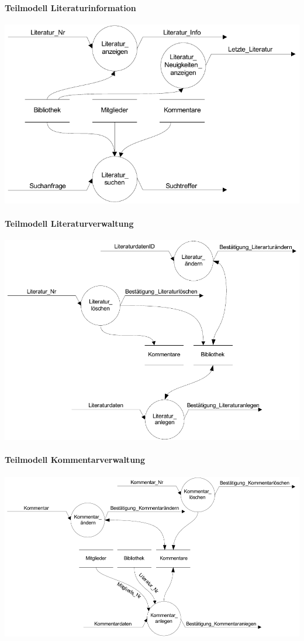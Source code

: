 \paragraph{Teilmodell Literaturinformation}
\includegraphics[scale=1.0]{teilmodell_literaturinformation}

\paragraph{Teilmodell Literaturverwaltung}
\includegraphics[scale=0.93]{teilmodell_bibliotheksverwaltung}

\paragraph{Teilmodell Kommentarverwaltung}
\includegraphics[scale=0.88]{teilmodell_kommentarverwaltung}

